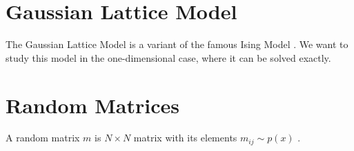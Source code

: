 \documentclass{tstextbook}
\begin{document}
\section{Gaussian Lattice Model}
The Gaussian Lattice Model is a variant of the famous Ising Model \cite{mussardo2010}. We want to study this model in the one-dimensional case, where it can be solved exactly.

\section{Random Matrices}
A random matrix $m$ is $N\times N$ matrix with its elements $m_{ij}\sim p(x)$ \cite{livan2017}.


\printbibliography{}


\printindex
\end{document}
